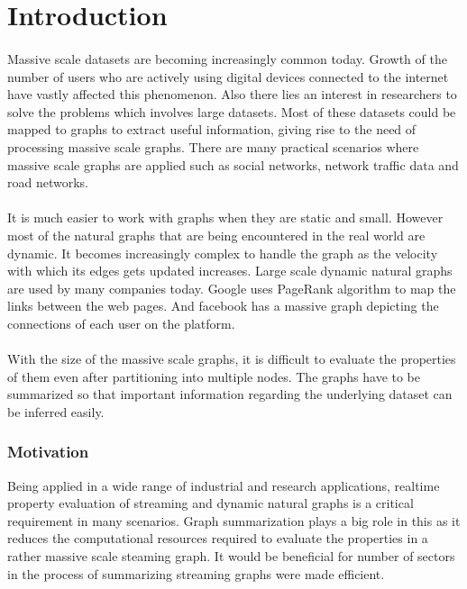 \section{Introduction}

\paragraph{}
Massive scale datasets are becoming increasingly common today. Growth of 
the number of users who are actively using digital devices connected to the 
internet have vastly affected this phenomenon. Also there lies an interest 
in researchers to solve the problems which involves large datasets. Most of 
these datasets could be mapped to graphs to extract useful information, 
giving rise to the need of processing massive scale graphs. There are many 
practical scenarios where massive scale graphs are applied such as social 
networks, network traffic data and road networks.

\paragraph{}
It is much easier to work with graphs when they are static and small. However 
most of the natural graphs that are being encountered in the real world are 
dynamic. It becomes increasingly complex to handle the graph as the velocity
with which its edges gets updated increases. Large scale dynamic natural 
graphs are used by many companies today. Google uses PageRank 
algorithm\cite{brin_anatomy_1998} to map the links between the web pages. 
And facebook has a massive graph depicting the connections of each user 
on the platform. 

\paragraph{}
With the size of the massive scale graphs, it is difficult to evaluate the 
properties of them even after partitioning into multiple nodes. The graphs 
have to be summarized so that important information regarding the underlying 
dataset can be inferred easily.

\subsubsection{Motivation}
Being applied in a wide range of industrial and research applications, 
realtime property evaluation of streaming and dynamic natural graphs is a 
critical requirement in many scenarios. Graph summarization plays a big 
role in this as it reduces the computational resources required to evaluate 
the properties in a rather massive scale steaming graph. It would be beneficial 
for number of sectors in the process of summarizing streaming graphs were 
made efficient.

